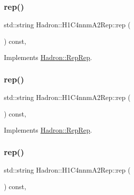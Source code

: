 \subsubsection{\texorpdfstring{rep()}{rep()}\hspace{0.1cm}{\footnotesize\ttfamily [1/3]}}
{\footnotesize\ttfamily std\+::string Hadron\+::\+H1\+C4nnm\+A2\+Rep\+::rep (\begin{DoxyParamCaption}{ }\end{DoxyParamCaption}) const\hspace{0.3cm}{\ttfamily [inline]}, {\ttfamily [virtual]}}



Implements \mbox{\hyperlink{structHadron_1_1RepRep_ab3213025f6de249f7095892109575fde}{Hadron\+::\+Rep\+Rep}}.

\mbox{\label{structHadron_1_1H1C4nnmA2Rep_a1f403babca36b3e12ab4f6a84e0b0bfd}} 
\subsubsection{\texorpdfstring{rep()}{rep()}\hspace{0.1cm}{\footnotesize\ttfamily [2/3]}}
{\footnotesize\ttfamily std\+::string Hadron\+::\+H1\+C4nnm\+A2\+Rep\+::rep (\begin{DoxyParamCaption}{ }\end{DoxyParamCaption}) const\hspace{0.3cm}{\ttfamily [inline]}, {\ttfamily [virtual]}}



Implements \mbox{\hyperlink{structHadron_1_1RepRep_ab3213025f6de249f7095892109575fde}{Hadron\+::\+Rep\+Rep}}.

\mbox{\label{structHadron_1_1H1C4nnmA2Rep_a1f403babca36b3e12ab4f6a84e0b0bfd}} 
\subsubsection{\texorpdfstring{rep()}{rep()}\hspace{0.1cm}{\footnotesize\ttfamily [3/3]}}
{\footnotesize\ttfamily std\+::string Hadron\+::\+H1\+C4nnm\+A2\+Rep\+::rep (\begin{DoxyParamCaption}{ }\end{DoxyParamCaption}) const\hspace{0.3cm}{\ttfamily [inline]}, {\ttfamily [virtual]}}



